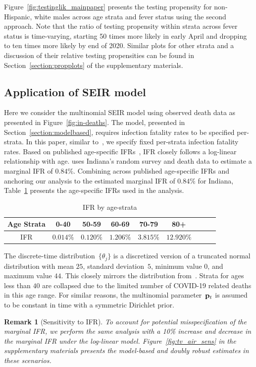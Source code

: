 \documentclass[11pt]{amsart}
\numberwithin{equation}{section}
\theoremstyle{plain}
\newtheorem{remark}{Remark}
\begin{document}
Figure~\ref{fig:testinglik_mainpaper} presents the testing propensity for non-Hispanic, white males across age strata and fever status using the second approach.  Note that the ratio of testing propensity within strata across fever status is time-varying, starting 50 times more likely in early April and dropping to ten times more likely by end of 2020.  Similar plots for other strata and a discussion of their relative testing propensities can be found in Section~\ref{section:propplots} of the supplementary materials.



 \subsection{Application of SEIR model}
 \label{section:application_of_modelbased}

 Here we consider the multinomial SEIR model using observed death data as presented in Figure~\ref{fig:in-deaths}. The model, presented in Section~\ref{section:modelbased}, requires infection fatality rates to be specified per-strata.  In this paper, similar to~\cite{Johndrow2020}, we specify fixed per-strata infection fatality rates.  Based on published age-specific IFRs~\citep{Levin2020}, IFR closely follows a log-linear relationship with age. \cite{Ironse2103272118} uses Indiana's random survey and death data to estimate a marginal IFR of $0.84\%$.  Combining across published age-specific IFRs and anchoring our analysis to the estimated marginal IFR of $0.84\%$ for Indiana, Table~\ref{tab:ifrperage} presents the age-specific IFRs used in the analysis. \begin{table}[!th]
 \begin{tabular}{c | c c c c c c c c}
 Age Strata & 0-40 & 50-59 & 60-69 & 70-79 & 80+ \\ \hline
 IFR & $0.014\%$ & $0.120\%$ & $1.206\%$ & $3.815\%$ & $12.920\%$
 \end{tabular}
 \caption{IFR by age-strata}
 \label{tab:ifrperage}
 \vspace{-1cm}
 \end{table}
 The discrete-time distribution~$\{ \theta_{j} \}$ is a discretized version of a truncated normal distribution with mean $25$, standard deviation~$5$, minimum value $0$, and maximum value $44$.  This closely mirrors the distribution from~\cite{Johndrow2020}. Strata for ages less than $40$ are collapsed due to the limited number of COVID-19 related deaths in this age range. For similar reasons, the multinomial parameter~${\bf p}_t$ is assumed to be constant in time with a symmetric Dirichlet prior.
 \vspace{-0.3cm}
 \begin{remark}[Sensitivity to IFR]
 To account for potential misspecification of the marginal IFR, we perform the same analysis with a 10\% increase and decrease in the marginal IFR under the log-linear model. Figure~\ref{fig:tv_air_sens} in the supplementary materials presents the model-based and doubly robust estimates in these scenarios.
 \end{remark}
\vspace{-0.3cm}
\end{document}
